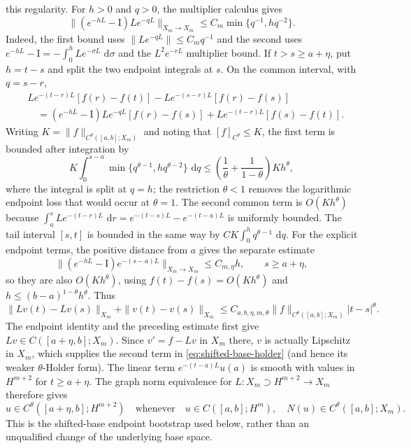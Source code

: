 \documentclass[11pt]{article}
\numberwithin{equation}{section}
\theoremstyle{definition}
\newcommand{\Id}{\mathrm I}
\newcommand{\dd}{\,\mathrm d}
\begin{document}
this regularity.  For $h>0$ and $q>0$, the multiplier calculus gives
\begin{equation}
 \|(e^{-hL}-\Id)Le^{-qL}\|_{X_m\to X_m}
 \le C_m\min\{q^{-1},h q^{-2}\}.
 \label{eq:shifted-base-difference-kernel}
\end{equation}
Indeed, the first bound uses $\|Le^{-qL}\|\le C_mq^{-1}$ and the second uses
$e^{-hL}-\Id=-\int_0^hLe^{-\sigma L}\,\dd\sigma$ and the
$L^2e^{-rL}$ multiplier bound.  If $t>s\ge a+\eta$, put $h=t-s$ and split
the two endpoint integrals at $s$.  On the common interval, with $q=s-r$,
\begin{align*}
&Le^{-(t-r)L}[f(r)-f(t)]-Le^{-(s-r)L}[f(r)-f(s)]\\
&\quad=(e^{-hL}-\Id)Le^{-qL}[f(r)-f(s)]
      +Le^{-(t-r)L}[f(s)-f(t)].
\end{align*}
Writing $K=\|f\|_{C^\theta([a,b];X_m)}$ and noting that
$[f]_{C^\theta}\le K$, the first term is bounded after integration by
\begin{equation}
 K\int_0^{s-a}\min\{q^{\theta-1},h q^{\theta-2}\}\,\dd q
 \le \left(\frac1{\theta}+\frac1{1-\theta}\right)K h^\theta,
 \label{eq:shifted-base-holder-integral}
\end{equation}
where the integral is split at $q=h$; the restriction $\theta<1$ removes the
logarithmic endpoint loss that would occur at $\theta=1$.  The second common
term is $O(Kh^\theta)$ because
$\int_a^sLe^{-(t-r)L}\,\dd r=e^{-(t-s)L}-e^{-(t-a)L}$ is uniformly bounded.
The tail interval $[s,t]$ is bounded in the same way by
$CK\int_0^h q^{\theta-1}\,\dd q$.  For the explicit endpoint terms, the
positive distance from $a$ gives the separate estimate
\begin{equation}
 \|(e^{-hL}-\Id)e^{-(s-a)L}\|_{X_m\to X_m}
 \le C_{m,\eta}h,
 \qquad s\ge a+\eta,
 \label{eq:shifted-base-endpoint-factor}
\end{equation}
so they are also $O(Kh^\theta)$, using $f(t)-f(s)=O(Kh^\theta)$ and
$h\le (b-a)^{1-\theta}h^\theta$.  Thus
\begin{equation}
 \|Lv(t)-Lv(s)\|_{X_m}+\|v(t)-v(s)\|_{X_m}
 \le C_{a,b,\eta,m,\theta}\|f\|_{C^\theta([a,b];X_m)}|t-s|^\theta.
 \label{eq:shifted-base-holder}
\end{equation}
The endpoint identity and the preceding estimate first give
$Lv\in C([a+\eta,b];X_m)$.  Since $v'=f-Lv$ in $X_m$ there, $v$ is actually
Lipschitz in $X_m$, which supplies the second term in
\eqref{eq:shifted-base-holder} (and hence its weaker $\theta$-Holder form).
The linear term $e^{-(t-a)L}u(a)$ is smooth with values in $H^{m+2}$ for
$t\ge a+\eta$.  The graph norm equivalence for $L:X_m\supset H^{m+2}\to X_m$
therefore gives
\begin{equation}
 u\in C^\theta([a+\eta,b];H^{m+2})
 \quad\text{whenever}\quad
 u\in C([a,b];H^m),\quad N(u)\in C^\theta([a,b];X_m).
 \label{eq:shifted-base-bootstrap}
\end{equation}
This is the shifted-base endpoint bootstrap used below, rather than an
unqualified change of the underlying base space.
\end{document}
